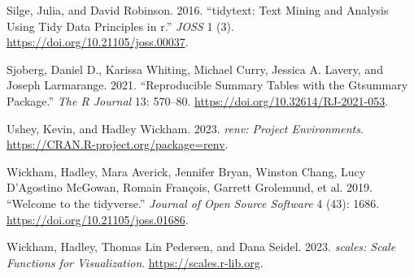 \documentclass[
]{article}
\newlength{\cslhangindent}
\newlength{\cslentryspacingunit} %
\newenvironment{CSLReferences}[2] %
 {%
  \setlength{\parindent}{0pt}
  \ifodd #1
  \let\oldpar\par
  \def\par{\hangindent=\cslhangindent\oldpar}
  \fi
  \setlength{\parskip}{#2\cslentryspacingunit}
 }%
 {}
\begin{document}
\begin{CSLReferences}{1}{0}
\leavevmode{}%
Silge, Julia, and David Robinson. 2016. {``{tidytext}: Text Mining and
Analysis Using Tidy Data Principles in r.''} \emph{JOSS} 1 (3).
\url{https://doi.org/10.21105/joss.00037}.

\leavevmode{}%
Sjoberg, Daniel D., Karissa Whiting, Michael Curry, Jessica A. Lavery,
and Joseph Larmarange. 2021. {``Reproducible Summary Tables with the
Gtsummary Package.''} \emph{{The R Journal}} 13: 570--80.
\url{https://doi.org/10.32614/RJ-2021-053}.

\leavevmode{}%
Ushey, Kevin, and Hadley Wickham. 2023. \emph{{renv}: Project
Environments}. \url{https://CRAN.R-project.org/package=renv}.

\leavevmode{}%
Wickham, Hadley, Mara Averick, Jennifer Bryan, Winston Chang, Lucy
D'Agostino McGowan, Romain François, Garrett Grolemund, et al. 2019.
{``Welcome to the {tidyverse}.''} \emph{Journal of Open Source Software}
4 (43): 1686. \url{https://doi.org/10.21105/joss.01686}.

\leavevmode{}%
Wickham, Hadley, Thomas Lin Pedersen, and Dana Seidel. 2023.
\emph{{scales}: Scale Functions for Visualization}.
\url{https://scales.r-lib.org}.

\end{CSLReferences}
\end{document}
